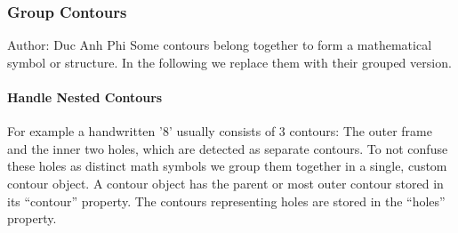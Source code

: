 \documentclass[12pt]{article}
\begin{document}
	\subsubsection{Group Contours}
	\small{Author: Duc Anh Phi} \newline \newline
	Some contours belong together to form a mathematical symbol or structure. In the following we replace them with their grouped version.
	
	\paragraph{Handle Nested Contours}
	For example a handwritten '8' usually consists of 3 contours: The outer frame and the inner two holes, which are detected as separate contours.
	To not confuse these holes as distinct math symbols we group them together in a single, custom contour object.
	A contour object has the parent or most outer contour stored in its “contour” property.
	The contours representing holes are stored in the “holes” property.
	
\end{document}
